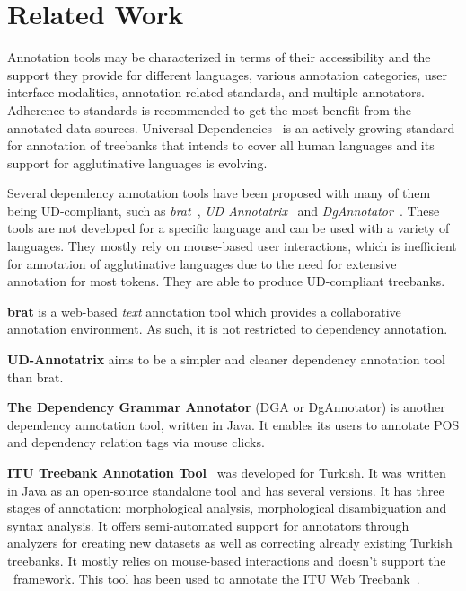 \section{Related Work}
\label{sec:related}

Annotation tools may be characterized in terms of their accessibility and the support they provide for different languages, various annotation categories, user interface modalities, annotation related standards, and multiple annotators.
Adherence to standards is recommended to get the most benefit from the annotated data sources.
Universal Dependencies~\cite{UD} is an actively growing standard for annotation of treebanks that intends to cover all human languages and its support for agglutinative languages is evolving.

Several dependency annotation tools have been proposed with many of them being UD-compliant, such as \textit{brat}~\cite{brat}, \textit{UD Annotatrix}~\cite{ud-annotatrix} and \textit{DgAnnotator}~\cite{dgannotator}.
These tools are not developed for a specific language and can be used with a variety of languages.
They mostly rely on mouse-based user interactions, which is inefficient for annotation of agglutinative languages due to the need for extensive annotation for most tokens.
They are able to produce UD-compliant treebanks.

\textbf{brat} is a web-based \textit{text} annotation tool which provides a collaborative annotation environment. As such, it is not restricted to dependency annotation.

\textbf{UD-Annotatrix} aims to be a simpler and cleaner dependency annotation tool than brat.

\textbf{The Dependency Grammar Annotator} (DGA or DgAnnotator) is another dependency annotation tool, written in Java. It enables its users to annotate POS and dependency relation tags via mouse clicks.

\textbf{ITU Treebank Annotation Tool}~\cite{itu-annotation-tool} was developed for Turkish.
It was written in Java as an open-source standalone tool and has several versions.
It has three stages of annotation: morphological analysis, morphological disambiguation and syntax analysis.
It offers semi-automated support for annotators through analyzers for creating new datasets as well as correcting already existing Turkish treebanks.
It mostly relies on mouse-based interactions and doesn't support the \ud\ framework.
This tool has been used to annotate the ITU Web Treebank~\cite{itu-web-tb}.

